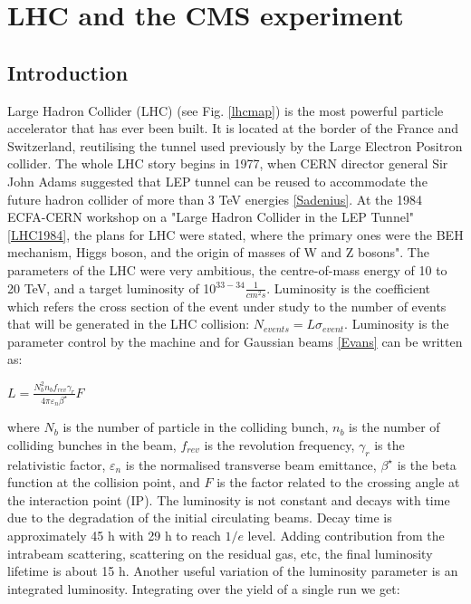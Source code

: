\chapter{LHC and the CMS experiment}
\label{ch:cms}

\section{Introduction}\label{sec:cms_intro}
Large Hadron Collider (LHC) (see Fig. \ref{lhcmap}) is the most powerful particle accelerator that has ever been built. It is located at the border of the France and Switzerland, reutilising the tunnel used previously by the Large Electron Positron collider. The whole LHC story begins in 1977, when CERN director general Sir John Adams suggested that LEP tunnel can be reused to accommodate the future hadron collider of more than 3 TeV energies \ref{Sadenius}. At the 1984 ECFA-CERN workshop on a "Large Hadron Collider in the LEP Tunnel" \ref{LHC1984}, the plans for LHC were stated, where the primary ones were the BEH mechanism, Higgs boson, and the origin of masses of W and Z bosons". The parameters of the LHC were very ambitious, the centre-of-mass energy of 10 to 20 TeV, and a target luminosity of 10$^{33-34}\frac{1}{cm^{2}s}$. Luminosity is the coefficient which refers the cross section of the event under study to the number of events that will be generated in the LHC collision: $N_{events} = L \sigma_{event}$. Luminosity is the parameter control by the machine and for Gaussian beams \ref{Evans} can be written as:

$L=\frac{N^2_bn_bf_{rev}\gamma_r}{4\pi\varepsilon_n\beta^\star}F$

where $N_b$ is the number of particle in the colliding bunch, $n_b$ is the number of colliding bunches in the beam, $f_{rev}$ is the revolution frequency, $\gamma_r$ is the relativistic factor, $\varepsilon_n$ is the normalised transverse beam emittance, $\beta^\star$ is the beta function at the collision point, and $F$ is the factor related to the crossing angle at the interaction point (IP). The luminosity is not constant and decays with time due to the degradation of the initial circulating beams. Decay time is approximately 45 h with 29 h to reach $1/e$ level. Adding contribution from the intrabeam scattering, scattering on the residual gas, etc, the final luminosity lifetime is about 15 h. Another useful variation of the luminosity parameter is an integrated luminosity. Integrating over the yield of a single run we get: 

